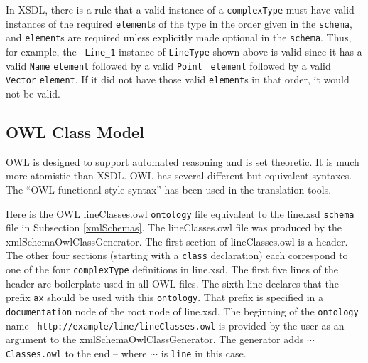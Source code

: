 \documentclass[preprint,12pt]{elsarticle}
\begin{document}
In XSDL, there is a rule that a valid instance of a {\tt complexType} must
have valid instances of the required {\tt element}s of the type in the
order given in the {\tt schema}, and {\tt element}s are required unless
explicitly made optional in the {\tt schema}. Thus, for example, the {\tt
  Line\_1} instance of {\tt LineType} shown above is valid since it has a
valid {\tt Name} {\tt element} followed by a valid {\tt Point} {\tt
  element} followed by a valid {\tt Vector} {\tt element}. If it did not
have those valid {\tt element}s in that order, it would not be valid.

\subsection{OWL Class Model}
\label{owlClassModel}

OWL is designed to support automated reasoning and is set theoretic. It is
much more atomistic than XSDL. OWL has several different but equivalent
syntaxes. The “OWL functional-style syntax” has been used in the
translation tools.

Here is the OWL lineClasses.owl {\tt ontology} file equivalent to the
line.xsd {\tt schema} file in Subsection \ref{xmlSchemas}. The
lineClasses.owl file was produced by the xmlSchemaOwlClassGenerator. The
first section of lineClasses.owl is a header. The other four sections
(starting with a {\tt class} declaration) each correspond to one of the
four {\tt complexType} definitions in line.xsd. The first five lines of the
header are boilerplate used in all OWL files. The sixth line declares that
the prefix {\tt ax} should be used with this {\tt ontology}. That prefix is
specified in a {\tt documentation} node of the root node of line.xsd. The
beginning of the {\tt ontology} name {\tt
  http://example/line/lineClasses.owl} is provided by the user as an
argument to the xmlSchemaOwlClassGenerator. The generator adds $\cdots${\tt
  Classes.owl} to the end -- where $\cdots$ is {\tt line} in this case.
\end{document}
